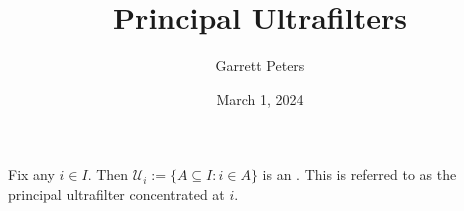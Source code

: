 \documentclass[a4paper]{article}
\title{Principal Ultrafilters}
\date{March 1, 2024}
\author{Garrett Peters}
\begin{document}
\maketitle
\par{Fix any \(i \in  I\). Then \(\mathcal {U}_i :=  \{ A \subseteq  I: i \in  A \}\) is an . This is referred to as the principal ultrafilter concentrated at \(i\).}
\printbibliography
\end{document}
